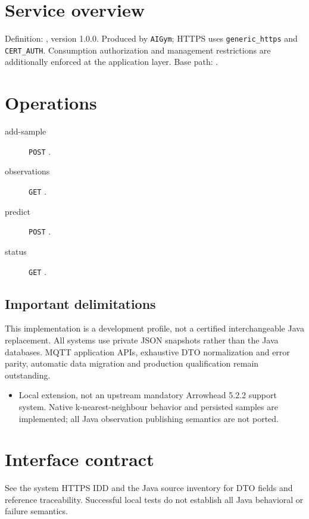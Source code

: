 \documentclass[a4paper]{arrowhead}
\begin{document}
\ArrowheadSetup
\section{Service overview}
Definition: , version 1.0.0. Produced by \texttt{AIGym}; HTTPS uses \texttt{generic\_https} and \texttt{CERT\_AUTH}. Consumption authorization and management restrictions are additionally enforced at the application layer. Base path: .
\section{Operations}
\begin{description}
\item[add-sample] \texttt{POST} .
\item[observations] \texttt{GET} .
\item[predict] \texttt{POST} .
\item[status] \texttt{GET} .
\end{description}
\subsection{Important delimitations}
This implementation is a development profile, not a certified interchangeable Java replacement. All systems use private JSON snapshots rather than the Java databases. MQTT application APIs, exhaustive DTO normalization and error parity, automatic data migration and production qualification remain outstanding.
\begin{itemize}
\item Local extension, not an upstream mandatory Arrowhead 5.2.2 support system. Native k-nearest-neighbour behavior and persisted samples are implemented; all Java observation publishing semantics are not ported.
\end{itemize}
\section{Interface contract}
See the system HTTPS IDD and the Java source inventory for DTO fields and reference traceability. Successful local tests do not establish all Java behavioral or failure semantics.
\end{document}

